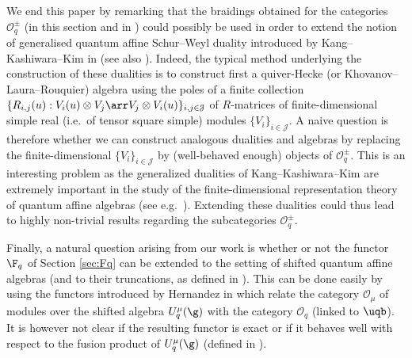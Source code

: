 \documentclass[11pt]{amsart}
\theoremstyle{definition}
\theoremstyle{remark}
\numberwithin{equation}{section}
\begin{document}
We end this paper by remarking that the braidings obtained for the categories $\mathcal{O}_q^{\pm}$ (in this section and in \cite{her}) could possibly be used in order to extend the notion of generalised quantum affine Schur--Weyl duality introduced by Kang--Kashiwara--Kim in \cite{kkk} (see also \cite{fuj}). Indeed, the typical method underlying the construction of these dualities is to construct first a quiver-Hecke (or Khovanov--Laura--Rouquier) algebra using the poles of a finite collection $\{R_{i,j}(u):V_i(u)\otimes V_j\arr V_j\otimes V_i(u)\}_{i,j\in \mathcal{J}}$ of $R$-matrices of finite-dimensional simple real (i.e.~of tensor square simple) modules $\{V_i\}_{i\in \mathcal{J}}$. A naive question is therefore whether we can construct analogous dualities and algebras by replacing the finite-dimensional $\{V_i\}_{i\in \mathcal{J}}$ by (well-behaved enough) objects of $\mathcal{O}^{\pm}_q$. This is an interesting problem as the generalized dualities of Kang--Kashiwara--Kim are extremely important in the study of the finite-dimensional representation theory of quantum affine algebras (see e.g.~\cite{fuj,kko}). Extending these dualities could thus lead to highly non-trivial results regarding the subcategories $\mathcal{O}^{\pm}_q$. \par 
 
 Finally, a natural question arising from our work is whether or not the functor $\F_q$ of Section \ref{sec:Fq} can be extended to the setting of shifted quantum affine algebras (and to their truncations, as defined in \cite{hshift}). This can be done easily by using the functors introduced by Hernandez in \cite[Section 7]{hshift} which relate the category $\mathcal{O}_{\mu}$ of modules over the shifted algebra $U_q^{\mu}(\g)$ with the category $\mathcal{O}_q$ (linked to $\uqb$). It is however not clear if the resulting functor is exact or if it behaves well with respect to the fusion product of $U_q^{\mu}(\g)$ (defined in \cite[Section 5]{hshift}).

\appendix
\end{document}
